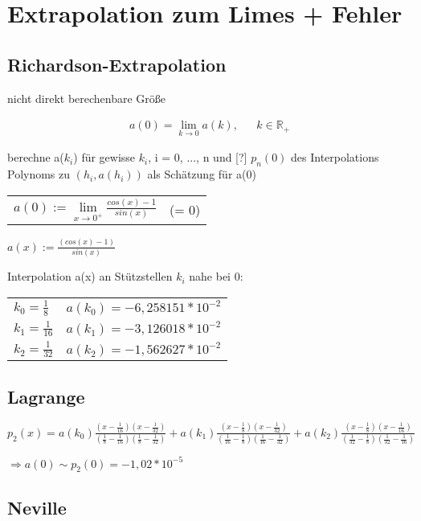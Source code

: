 \documentclass[12pt,a4paper]{article} %
\begin{document}
	\newpage
	
	\section[Extrapolation]{Extrapolation zum Limes + Fehler}
	
	\subsection{Richardson-Extrapolation}
	
	nicht direkt berechenbare Größe
	
	\begin{align*}
		a(0) = \lim\limits_{k\rightarrow 0}a(k), && k \in \mathbb{R}_+
	\end{align*}
	
	berechne a($k_i$) für gewisse $k_i$, i = 0, ..., n und [?] $p_n(0)$ des Interpolations Polynoms zu $(h_i, a(h_i))$ als Schätzung für a(0)
		
	\begin{tabular}{l l}
		$a(0) := \lim\limits_{x\rightarrow 0^+} \frac{cos(x) - 1}{sin(x)}$ & (= 0)
	\end{tabular}

	$a(x) := \frac{(cos(x) - 1)}{sin(x)}$
	
	Interpolation a(x) an Stützstellen $k_i$ nahe bei 0: 
	
	\begin{tabular}{l l}
		$k_0 = \frac{1}{8}$ & $a(k_0) = -6,258151 * 10^{-2}$ \\
		$k_1 = \frac{1}{16}$ & $a(k_1) = -3,126018 * 10^{-2}$ \\
		$k_2 = \frac{1}{32}$ & $a(k_2) = -1,562627 * 10^{-2}$
	\end{tabular}
	
	\subsection{Lagrange}
	
	$p_2(x) = a(k_0) \frac{(x - \frac{1}{16})(x - \frac{1}{32})}{(\frac{1}{8} - \frac{1}{16})(\frac{1}{8} - \frac{1}{32})} + a(k_1)\frac{(x - \frac{1}{8})(x - \frac{1}{32})}{(\frac{1}{16} - \frac{1}{8})(\frac{1}{16} - \frac{1}{32})} + a(k_2) \frac{(x - \frac{1}{8})(x - \frac{1}{16})}{(\frac{1}{32} - \frac{1}{8})(\frac{1}{32} - \frac{1}{16})}$
	
	$\Rightarrow a(0) \sim p_2(0) = -1,02 * 10^{-5}$
	
	\subsection{Neville}
	
\end{document}
